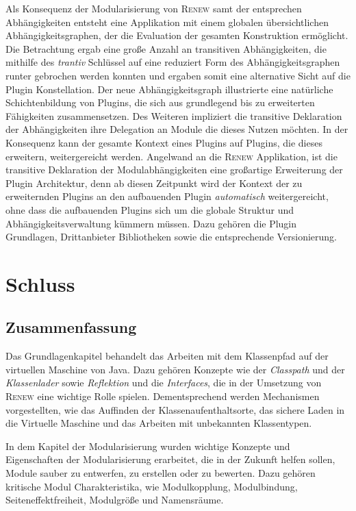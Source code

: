 Als Konsequenz der Modularisierung von \textsc{Renew} samt der entsprechen Abhängigkeiten entsteht eine Applikation mit einem globalen übersichtlichen Abhängigkeitsgraphen, der die Evaluation der gesamten Konstruktion ermöglicht. Die Betrachtung ergab eine große Anzahl an transitiven Abhängigkeiten, die mithilfe des \textit{trantiv} Schlüssel auf eine reduziert Form des Abhängigkeitsgraphen runter gebrochen werden konnten und ergaben somit eine alternative Sicht auf die Plugin Konstellation. Der neue Abhängigkeitsgraph illustrierte eine natürliche Schichtenbildung von Plugins, die sich aus grundlegend bis zu erweiterten Fähigkeiten zusammensetzen. Des Weiteren impliziert die transitive Deklaration der Abhängigkeiten ihre Delegation an Module die dieses Nutzen möchten. In der Konsequenz kann der gesamte Kontext eines Plugins auf Plugins, die dieses erweitern, weitergereicht werden. \newline
Angelwand an die \textsc{Renew} Applikation, ist die transitive Deklaration der Modulabhängigkeiten eine großartige Erweiterung der Plugin Architektur, denn ab diesen Zeitpunkt wird der Kontext der zu erweiternden Plugins an den aufbauenden Plugin \textit{automatisch} weitergereicht, ohne dass die aufbauenden Plugins sich um die globale Struktur und Abhängigkeitsverwaltung kümmern müssen. Dazu gehören die Plugin Grundlagen, Drittanbieter Bibliotheken sowie die entsprechende Versionierung. \newline



\chapter{Schluss}


\section{Zusammenfassung}

Das Grundlagenkapitel behandelt das Arbeiten mit dem Klassenpfad auf der virtuellen Maschine von Java. Dazu gehören Konzepte wie der \textit{Classpath} und der \textit{Klassenlader} sowie \textit{Reflektion} und die \textit{Interfaces}, die in der Umsetzung von \textsc{Renew} eine wichtige Rolle spielen. Dementsprechend werden Mechanismen vorgestellten, wie das Auffinden der Klassenaufenthaltsorte, das sichere Laden in die Virtuelle Maschine und das Arbeiten mit unbekannten Klassentypen.\bigbreak

In dem Kapitel der Modularisierung wurden wichtige Konzepte und Eigenschaften der Modularisierung erarbeitet, die in der Zukunft helfen sollen, Module sauber zu entwerfen, zu erstellen oder zu bewerten. Dazu gehören kritische Modul Charakteristika, wie Modulkopplung, Modulbindung, Seiteneffektfreiheit, Modulgröße und Namensräume. \bigbreak

